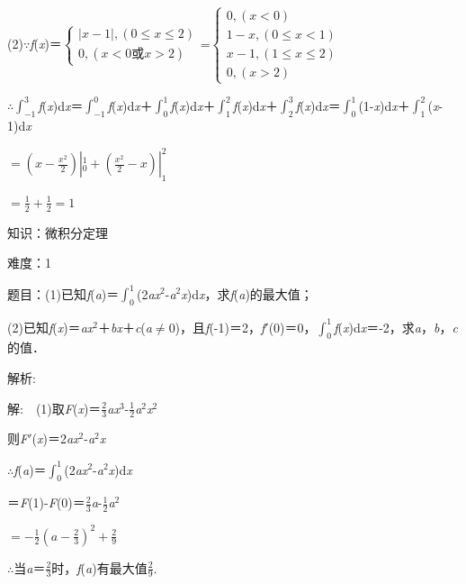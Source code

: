 \documentclass{article} %
\begin{document}
(2)$\mathrm{\because}$\textit{f}(\textit{x})＝$\left\{\begin{array}{l}|x-1|, (0\le x\le 2)\\0, (x<0\text{或}x>2)\end{array}\right.$=$\left\{\begin{array}{l}
0, (x<0)\\1-x, (0\le x<1)\\x-1, (1\le x \le 2)\\0, (x>2)\end{array}\right.$

$\mathrm{\therefore}$$\int_{-1}^{3}$\textit{f}(\textit{x})d\textit{x}＝$\int_{-1}^{0}$\textit{f}(\textit{x})d\textit{x}＋$\int_{0}^{1}$\textit{f}(\textit{x})d\textit{x}＋$\int_{1}^{2}$\textit{f}(\textit{x})d\textit{x}＋$\int_{2}^{3}$\textit{f}(\textit{x})d\textit{x}＝$\int_{0}^{1}$(1-\textit{x})d\textit{x}＋$\int_{1}^{2}$(\textit{x}-1)d\textit{x}

$=(x-\frac{x^2}{2})|_0^1+(\frac{x^2}{2}-x)|_1^2$

$=\frac{1}{2}+\frac{1}{2}=1$



 知识：微积分定理

 难度：1

 题目：(1)已知\textit{f}(\textit{a})＝$\int_0^1$(2\textit{ax}${}^{2}$-\textit{a}${}^{2}$\textit{x})d\textit{x}，求\textit{f}(\textit{a})的最大值；

(2)已知\textit{f}(\textit{x})＝\textit{ax}${}^{2}$＋\textit{bx}＋\textit{c}(\textit{a}$\mathrm{\neq}$0)，且\textit{f}(-1)＝2，\textit{f}$'$(0)＝0，$\int_{0}^{1}$\textit{f}(\textit{x})d\textit{x}＝-2，求\textit{a}，\textit{b}，\textit{c}的值．

 解析:

 解:　(1)取\textit{F}(\textit{x})＝$\frac{2}{3}$\textit{ax}${}^{3}$-$\frac{1}{2}$\textit{a}${}^{2}$\textit{x}${}^{2}$

则\textit{F}$'$(\textit{x})＝2\textit{ax}${}^{2}$-\textit{a}${}^{2}$\textit{x}

$\mathrm{\therefore}$\textit{f}(\textit{a})＝$\int_0^1$(2\textit{ax}${}^{2}$-\textit{a}${}^{2}$\textit{x})d\textit{x}

＝\textit{F}(1)-\textit{F}(0)＝$\frac{2}{3}$\textit{a}-$\frac{1}{2}$\textit{a}${}^{2}$

$=-\frac{1}{2}(a-\frac{2}{3})^2+\frac{2}{9}$

$\mathrm{\therefore}$当\textit{a}＝$\frac{2}{3}$时，\textit{f}(\textit{a})有最大值$\frac{2}{9}$.
\end{document}
